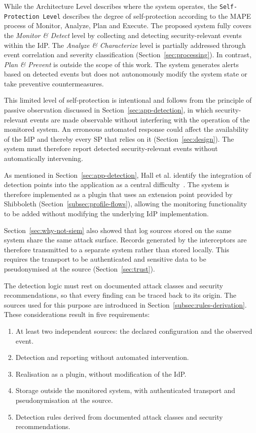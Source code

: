 \documentclass[../main.tex]{subfiles}
\begin{document}
While the Architecture Level describes where the system operates, the \texttt{Self-Protection Level} 
describes the degree of self-protection according to the MAPE process of Monitor, Analyze, 
Plan and Execute. 
The proposed system fully covers the \textit{Monitor \& Detect} level by collecting and detecting 
security-relevant events within the IdP. 
The \textit{Analyze \& Characterize} level is partially addressed through event correlation and 
severity classification (Section~\ref{sec:processing}). 
In contrast, \textit{Plan \& Prevent} is outside the scope of this work. 
The system generates alerts based on detected events but does not autonomously modify the system 
state or take preventive countermeasures. 

This limited level of self-protection is intentional and follows from the principle of passive 
observation discussed in Section~\ref{sec:app-detection}, in which security-relevant events are made 
observable without interfering with the operation of the monitored system. 
An erroneous automated response could affect the availability of the IdP and thereby every SP that 
relies on it (Section~\ref{sec:design}). 
The system must therefore report detected security-relevant events without automatically intervening. 

As mentioned in Section~\ref{sec:app-detection}, Hall et al. identify the integration of detection 
points into the application as a central difficulty~\cite{BlackWatch}. 
The system is therefore implemented as a plugin that uses an extension point provided by Shibboleth 
(Section~\ref{subsec:profile-flows}), allowing the monitoring functionality to be added without 
modifying the underlying IdP implementation. 

Section~\ref{sec:why-not-siem} also showed that log sources stored on the same system share the 
same attack surface. 
Records generated by the interceptors are therefore transmitted to a separate system rather than 
stored locally. 
This requires the transport to be authenticated and sensitive data to be pseudonymised at the 
source (Section~\ref{sec:trust}). 

The detection logic must rest on documented attack classes and security recommendations, so 
that every finding can be traced back to its origin. 
The sources used for this purpose are introduced in Section~\ref{subsec:rules-derivation}. 
These considerations result in five requirements:

\begin{enumerate}
    \item At least two independent sources: the declared configuration and the observed event.
    \item Detection and reporting without automated intervention.
    \item Realisation as a plugin, without modification of the IdP.
    \item Storage outside the monitored system, with authenticated transport and pseudonymisation at the source.
    \item Detection rules derived from documented attack classes and security recommendations.
\end{enumerate}
\end{document}
